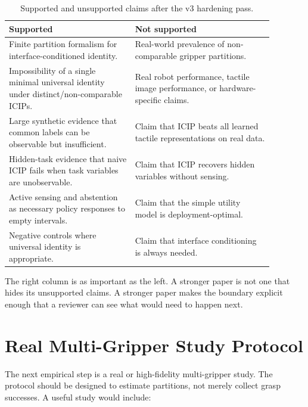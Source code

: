\documentclass{article}
\newcommand{\icip}{\textsc{ICIP}}
\begin{document}
\begin{table}[h]
\centering
\caption{Supported and unsupported claims after the v3 hardening pass.}
\small
\begin{tabular}{p{0.42\linewidth}p{0.46\linewidth}}
\toprule
Supported & Not supported \\
\midrule
Finite partition formalism for interface-conditioned identity. & Real-world prevalence of non-comparable gripper partitions. \\
Impossibility of a single minimal universal identity under distinct/non-comparable \icip{}s. & Real robot performance, tactile image performance, or hardware-specific claims. \\
Large synthetic evidence that common labels can be observable but insufficient. & Claim that \icip{} beats all learned tactile representations on real data. \\
Hidden-task evidence that naive \icip{} fails when task variables are unobservable. & Claim that \icip{} recovers hidden variables without sensing. \\
Active sensing and abstention as necessary policy responses to empty intervals. & Claim that the simple utility model is deployment-optimal. \\
Negative controls where universal identity is appropriate. & Claim that interface conditioning is always needed. \\
\bottomrule
\end{tabular}
\end{table}

The right column is as important as the left.
A stronger paper is not one that hides its unsupported claims.
A stronger paper makes the boundary explicit enough that a reviewer can see what would need to happen next.

\section{Real Multi-Gripper Study Protocol}

The next empirical step is a real or high-fidelity multi-gripper study.
The protocol should be designed to estimate partitions, not merely collect grasp successes.
A useful study would include:
\end{document}
